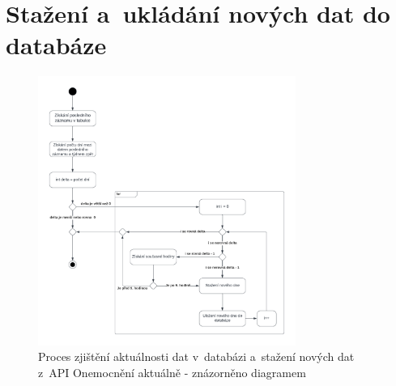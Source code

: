 \chapter{Stažení a~ukládání nových dat do databáze}

\begin{figure}[h]
	\centering
	\includegraphics[width=0.75\textwidth]{Pictures/diagram2.pdf}
	\caption{Proces zjištění aktuálnosti dat v~databázi a~stažení nových dat z~API Onemocnění aktuálně - znázorněno diagramem}
	\label{fig:Diagram2}
\end{figure}

\endinput